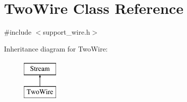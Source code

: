\hypertarget{class_two_wire}{}\section{Two\+Wire Class Reference}
\label{class_two_wire}


{\ttfamily \#include $<$support\+\_\+wire.\+h$>$}

Inheritance diagram for Two\+Wire\+:\begin{figure}[H]
\begin{center}
\leavevmode
\includegraphics[height=2.000000cm]{class_two_wire}
\end{center}
\end{figure}
